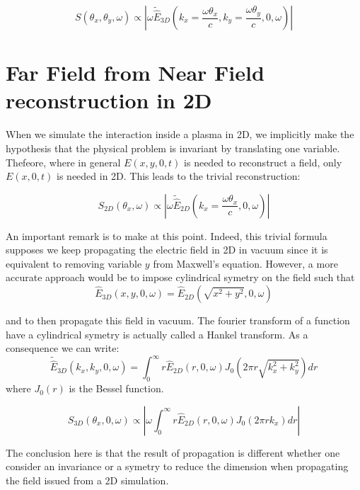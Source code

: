\begin{equation}
S(\theta_x,\theta_y,\omega) \propto|\omega\tilde{\hat{E}}_{3D}(k_x = \frac{\omega \theta_x}{c},k_y=\frac{\omega \theta_y}{c},0,\omega)|
\end{equation}


\section{Far Field from Near Field reconstruction in 2D}

When we simulate the interaction inside a plasma in 2D, we implicitly make the hypothesis that the physical problem is invariant by translating one variable. Thefeore, where in general $E(x,y,0,t)$ is needed to reconstruct a field, only $E(x,0,t)$ is needed in 2D. This leads to the trivial reconstruction:


\begin{equation}
S_{2D}(\theta_x,\omega) \propto|\omega\tilde{\hat{E}}_{2D}(k_x = \frac{\omega \theta_x}{c},0,\omega)|
\end{equation}

An important remark is to make at this point. Indeed, this trivial formula supposes we keep propagating the electric field in 2D in vacuum since it is equivalent to removing variable $y$ from Maxwell's equation. However, a more accurate approach would be to impose cylindrical symetry on the field such that
$$
\hat{E}_{3D}(x,y,0,\omega) = \hat{E}_{2D}(\sqrt{x^2+y^2},0,\omega)
$$

and to then propagate this field in vacuum. The fourier transform of a function have a cylindrical symetry is actually called a Hankel transform. As a consequence we can write:
$$
\tilde{\hat{E}}_{3D}(k_x,k_y,0,\omega) = \int_{0}^{\infty}r \hat{E}_{2D}(r,0,\omega)J_{0}(2 \pi r\sqrt{k_x^2+k_y^2})dr
$$
where $J_0(r)$ is the Bessel function.

\begin{equation}
S_{3D}(\theta_x,0,\omega) \propto|\omega \int_{0}^{\infty}r \hat{E}_{2D}(r,0,\omega)J_{0}(2\pi rk_x)dr|
\end{equation}

The conclusion here is that the result of propagation is different whether one consider an invariance or a symetry to reduce the dimension when propagating the field issued from a 2D simulation. 



















